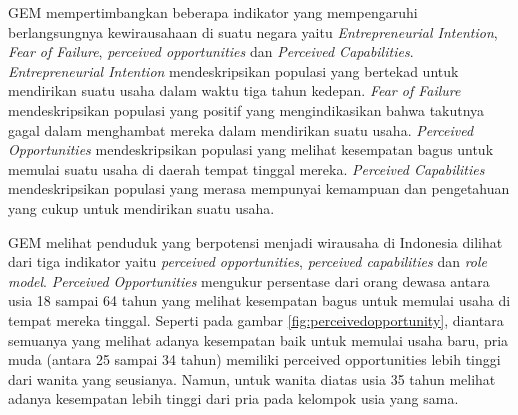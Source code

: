 
GEM mempertimbangkan beberapa indikator yang mempengaruhi berlangsungnya kewirausahaan di suatu negara yaitu \textit{Entrepreneurial Intention}, \textit{Fear of Failure}, \textit{perceived opportunities} dan \textit{Perceived Capabilities}. \textit{Entrepreneurial Intention} mendeskripsikan populasi yang bertekad untuk mendirikan suatu usaha dalam waktu tiga tahun kedepan. \textit{Fear of Failure} mendeskripsikan populasi yang positif yang mengindikasikan bahwa takutnya gagal dalam menghambat mereka dalam mendirikan suatu usaha. \textit{Perceived Opportunities} mendeskripsikan populasi yang melihat kesempatan bagus untuk memulai suatu usaha di daerah tempat tinggal mereka. \textit{Perceived Capabilities} mendeskripsikan populasi yang merasa mempunyai kemampuan dan pengetahuan yang cukup untuk mendirikan suatu usaha. \cite{wirausahaGEM}

GEM melihat penduduk yang berpotensi menjadi wirausaha di Indonesia
dilihat dari tiga indikator yaitu \textit{perceived opportunities}, \textit{perceived capabilities} dan \textit{role model}. \textit{Perceived Opportunities} mengukur persentase dari orang dewasa antara usia 18 sampai 64 tahun yang melihat kesempatan bagus untuk memulai usaha di tempat mereka tinggal. Seperti pada gambar \ref{fig:perceivedopportunity}, diantara semuanya yang melihat adanya kesempatan baik untuk memulai usaha baru, pria muda (antara 25 sampai 34 tahun) memiliki perceived opportunities lebih tinggi dari wanita yang seusianya. Namun, untuk wanita diatas usia 35 tahun melihat adanya kesempatan lebih tinggi dari pria pada kelompok usia yang sama.


